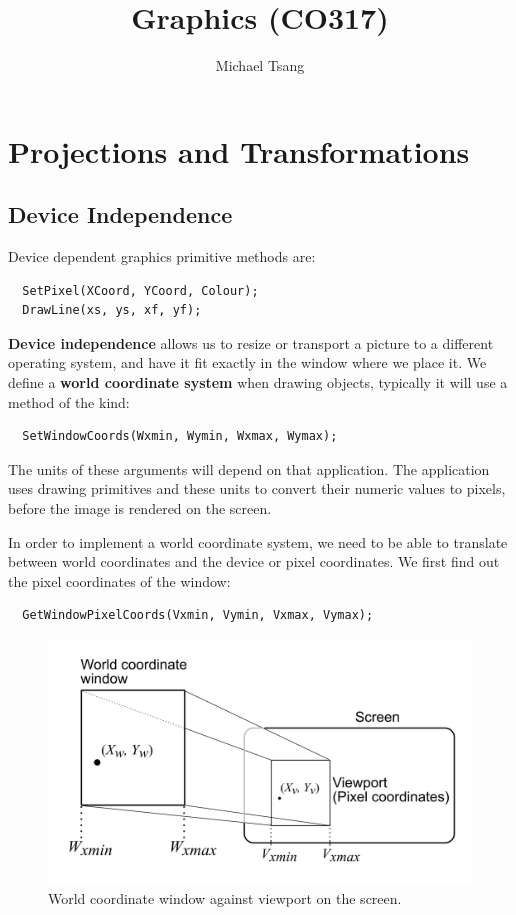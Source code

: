 \documentclass[11pt]{article}
\title{Graphics (CO317)}
\author{Michael Tsang}
\begin{document}
\maketitle

\section{Projections and Transformations}
\subsection{Device Independence}
Device dependent graphics primitive methods are:
\begin{verbatim}
  SetPixel(XCoord, YCoord, Colour);
  DrawLine(xs, ys, xf, yf);
\end{verbatim}

\textbf{Device independence} allows us to resize or transport a picture to a different operating system, and have it fit exactly in the window where we place it.
We define a \textbf{world coordinate system} when drawing objects, typically it will use a method of the kind:
\begin{verbatim}
  SetWindowCoords(Wxmin, Wymin, Wxmax, Wymax);
\end{verbatim}

The units of these arguments will depend on that application.
The application uses drawing primitives and these units to convert their numeric values to pixels, before the image is rendered on the screen.

In order to implement a world coordinate system, we need to be able to translate between world coordinates and the device or pixel coordinates.
We first find out the pixel coordinates of the window:
\begin{verbatim}
  GetWindowPixelCoords(Vxmin, Vymin, Vxmax, Vymax);
\end{verbatim}

\begin{figure}[htb!]
  \caption{World coordinate window against viewport on the screen.}
  \includegraphics[scale=0.4]{normalisation}
  \centering
\end{figure}
\end{document}
